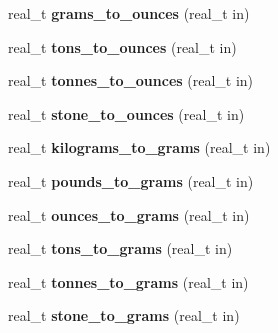 \begin{DoxyCompactItemize}
\item 
\hypertarget{namespaceetk_ac967abf83353f42e93595b2409d3eddd}{real\-\_\-t {\bfseries grams\-\_\-to\-\_\-ounces} (real\-\_\-t in)}\label{namespaceetk_ac967abf83353f42e93595b2409d3eddd}

\item 
\hypertarget{namespaceetk_a4a34f7b6f1fe9e82f0ecce7350c31249}{real\-\_\-t {\bfseries tons\-\_\-to\-\_\-ounces} (real\-\_\-t in)}\label{namespaceetk_a4a34f7b6f1fe9e82f0ecce7350c31249}

\item 
\hypertarget{namespaceetk_a03ae32e391c9e7d58b358b1feacf251e}{real\-\_\-t {\bfseries tonnes\-\_\-to\-\_\-ounces} (real\-\_\-t in)}\label{namespaceetk_a03ae32e391c9e7d58b358b1feacf251e}

\item 
\hypertarget{namespaceetk_ac174e95d021cc55347d8ec0b9c1ec8bc}{real\-\_\-t {\bfseries stone\-\_\-to\-\_\-ounces} (real\-\_\-t in)}\label{namespaceetk_ac174e95d021cc55347d8ec0b9c1ec8bc}

\item 
\hypertarget{namespaceetk_a0160eadd25586da782303b4a8935c958}{real\-\_\-t {\bfseries kilograms\-\_\-to\-\_\-grams} (real\-\_\-t in)}\label{namespaceetk_a0160eadd25586da782303b4a8935c958}

\item 
\hypertarget{namespaceetk_abd8dc1fb6136365e76993c9bce001358}{real\-\_\-t {\bfseries pounds\-\_\-to\-\_\-grams} (real\-\_\-t in)}\label{namespaceetk_abd8dc1fb6136365e76993c9bce001358}

\item 
\hypertarget{namespaceetk_aea8edb0624e7e70ed8bb7e9b39fb09f8}{real\-\_\-t {\bfseries ounces\-\_\-to\-\_\-grams} (real\-\_\-t in)}\label{namespaceetk_aea8edb0624e7e70ed8bb7e9b39fb09f8}

\item 
\hypertarget{namespaceetk_a2a77a82693139e102279471f45103ed1}{real\-\_\-t {\bfseries tons\-\_\-to\-\_\-grams} (real\-\_\-t in)}\label{namespaceetk_a2a77a82693139e102279471f45103ed1}

\item 
\hypertarget{namespaceetk_a4f87120504b18e993d5d650ecfaf9b53}{real\-\_\-t {\bfseries tonnes\-\_\-to\-\_\-grams} (real\-\_\-t in)}\label{namespaceetk_a4f87120504b18e993d5d650ecfaf9b53}

\item 
\hypertarget{namespaceetk_aa0b6a182d5596eb84db15a607a554cf3}{real\-\_\-t {\bfseries stone\-\_\-to\-\_\-grams} (real\-\_\-t in)}\label{namespaceetk_aa0b6a182d5596eb84db15a607a554cf3}


\end{DoxyCompactItemize}
